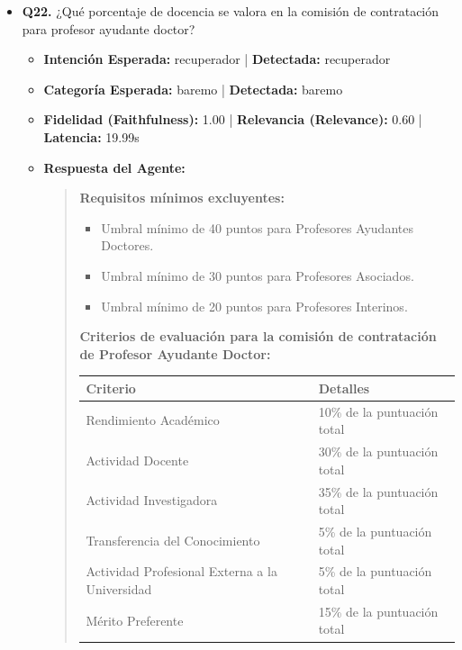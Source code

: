 \documentclass[12pt,a4paper,oneside]{report}
\begin{document}
\begin{itemize}
\begin{itemize}
\begin{itemize}
                  \item \href{https://www.us.es/bous-numeros/numero-20-22-de-diciembre-de-2023/acuerdo-64cg-20-12-23-normas-provisionales-para}{Acuerdo 6.4/CG 20-12-23, Normas provisionales para adaptar modo ... - us}
                  \item \href{https://tvirtual.us.es/teous-rest-api/document/15767}{CRITERIOS DE EVALUACIÓN DESGLOSE DE LOS EPÍGRAFES A VALOR}
                \end{itemize}
        \end{itemize}

  
\item \textbf{Q22.} ¿Qué porcentaje de docencia se valora en la comisión de contratación para profesor ayudante doctor? \\
        \begin{itemize}
          \item \textbf{Intención Esperada:} recuperador | \textbf{Detectada:} recuperador
          \item \textbf{Categoría Esperada:} baremo | \textbf{Detectada:} baremo
          \item \textbf{Fidelidad (Faithfulness):} 1.00 | \textbf{Relevancia (Relevance):} 0.60 | \textbf{Latencia:} 19.99s
          \item \textbf{{Respuesta del Agente:}} \\
                \begin{quote}
\textbf{Requisitos mínimos excluyentes:}
\begin{itemize}
  \item Umbral mínimo de 40 puntos para Profesores Ayudantes Doctores.
  \item Umbral mínimo de 30 puntos para Profesores Asociados.
  \item Umbral mínimo de 20 puntos para Profesores Interinos.
\end{itemize}

\textbf{Criterios de evaluación para la comisión de contratación de Profesor Ayudante Doctor:}


\begin{tabular}{p{3.5cm} p{8cm}}
\toprule
\textbf{Criterio} & \textbf{Detalles} \\
\midrule
Rendimiento Académico & 10\% de la puntuación total \\
Actividad Docente & 30\% de la puntuación total \\
Actividad Investigadora & 35\% de la puntuación total \\
Transferencia del Conocimiento & 5\% de la puntuación total \\
Actividad Profesional Externa a la Universidad & 5\% de la puntuación total \\
Mérito Preferente & 15\% de la puntuación total \\
\bottomrule
\end{tabular}



\end{quote}
\end{itemize}
\end{itemize}
\end{document}
